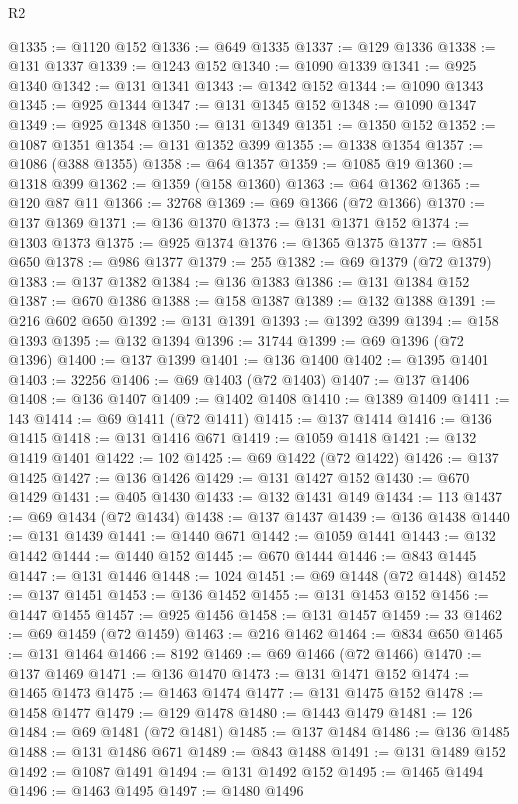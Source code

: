 \begin{lexlean}{R2}
\begin{coremodule}
@1335 := @1120 @152
@1336 := @649 @1335
@1337 := @129 @1336
@1338 := @131 @1337
@1339 := @1243 @152
@1340 := @1090 @1339
@1341 := @925 @1340
@1342 := @131 @1341
@1343 := @1342 @152
@1344 := @1090 @1343
@1345 := @925 @1344
@1347 := @131 @1345 @152
@1348 := @1090 @1347
@1349 := @925 @1348
@1350 := @131 @1349
@1351 := @1350 @152
@1352 := @1087 @1351
@1354 := @131 @1352 @399
@1355 := @1338 @1354
@1357 := @1086 (@388 @1355)
@1358 := @64 @1357
@1359 := @1085 @19
@1360 := @1318 @399
@1362 := @1359 (@158 @1360)
@1363 := @64 @1362
@1365 := @120 @87 @11
@1366 := 32768
@1369 := @69 @1366 (@72 @1366)
@1370 := @137 @1369
@1371 := @136 @1370
@1373 := @131 @1371 @152
@1374 := @1303 @1373
@1375 := @925 @1374
@1376 := @1365 @1375
@1377 := @851 @650
@1378 := @986 @1377
@1379 := 255
@1382 := @69 @1379 (@72 @1379)
@1383 := @137 @1382
@1384 := @136 @1383
@1386 := @131 @1384 @152
@1387 := @670 @1386
@1388 := @158 @1387
@1389 := @132 @1388
@1391 := @216 @602 @650
@1392 := @131 @1391
@1393 := @1392 @399
@1394 := @158 @1393
@1395 := @132 @1394
@1396 := 31744
@1399 := @69 @1396 (@72 @1396)
@1400 := @137 @1399
@1401 := @136 @1400
@1402 := @1395 @1401
@1403 := 32256
@1406 := @69 @1403 (@72 @1403)
@1407 := @137 @1406
@1408 := @136 @1407
@1409 := @1402 @1408
@1410 := @1389 @1409
@1411 := 143
@1414 := @69 @1411 (@72 @1411)
@1415 := @137 @1414
@1416 := @136 @1415
@1418 := @131 @1416 @671
@1419 := @1059 @1418
@1421 := @132 @1419 @1401
@1422 := 102
@1425 := @69 @1422 (@72 @1422)
@1426 := @137 @1425
@1427 := @136 @1426
@1429 := @131 @1427 @152
@1430 := @670 @1429
@1431 := @405 @1430
@1433 := @132 @1431 @149
@1434 := 113
@1437 := @69 @1434 (@72 @1434)
@1438 := @137 @1437
@1439 := @136 @1438
@1440 := @131 @1439
@1441 := @1440 @671
@1442 := @1059 @1441
@1443 := @132 @1442
@1444 := @1440 @152
@1445 := @670 @1444
@1446 := @843 @1445
@1447 := @131 @1446
@1448 := 1024
@1451 := @69 @1448 (@72 @1448)
@1452 := @137 @1451
@1453 := @136 @1452
@1455 := @131 @1453 @152
@1456 := @1447 @1455
@1457 := @925 @1456
@1458 := @131 @1457
@1459 := 33
@1462 := @69 @1459 (@72 @1459)
@1463 := @216 @1462
@1464 := @834 @650
@1465 := @131 @1464
@1466 := 8192
@1469 := @69 @1466 (@72 @1466)
@1470 := @137 @1469
@1471 := @136 @1470
@1473 := @131 @1471 @152
@1474 := @1465 @1473
@1475 := @1463 @1474
@1477 := @131 @1475 @152
@1478 := @1458 @1477
@1479 := @129 @1478
@1480 := @1443 @1479
@1481 := 126
@1484 := @69 @1481 (@72 @1481)
@1485 := @137 @1484
@1486 := @136 @1485
@1488 := @131 @1486 @671
@1489 := @843 @1488
@1491 := @131 @1489 @152
@1492 := @1087 @1491
@1494 := @131 @1492 @152
@1495 := @1465 @1494
@1496 := @1463 @1495
@1497 := @1480 @1496

\end{coremodule}
\end{lexlean}
